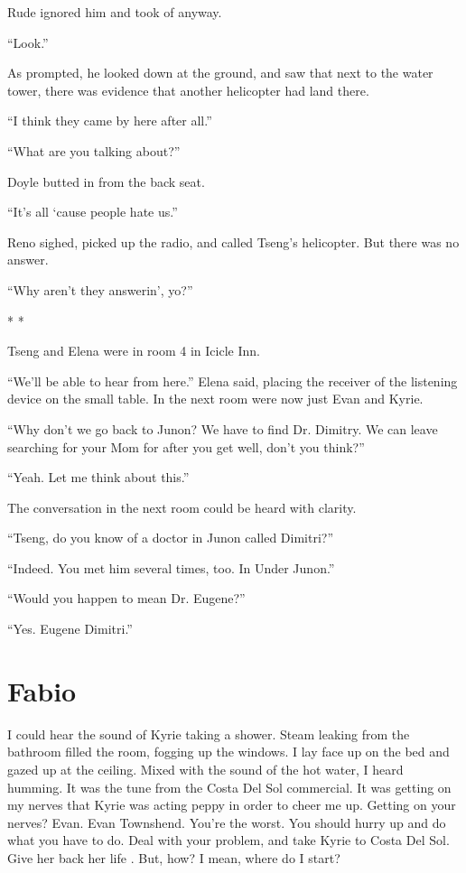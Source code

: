 \documentclass[oneside]{book}
\begin{document}
Rude ignored him and took of anyway.

“Look.”

As prompted, he looked down at the ground, and saw that next to the water tower, there was evidence that another helicopter had land there.

“I think they came by here after all.”

“What are you talking about?”

Doyle butted in from the back seat.

“It’s all ‘cause people hate us.”

Reno sighed, picked up the radio, and called Tseng’s helicopter. But there was no answer.

“Why aren’t they answerin’, yo?”

* *

Tseng and Elena were in room 4 in Icicle Inn.

“We’ll be able to hear from here.” Elena said, placing the receiver of the listening device on the small table. In the next room were now just Evan and Kyrie.

“Why don’t we go back to Junon? We have to find Dr. Dimitry. We can leave searching for your Mom for after you get well, don’t you think?”

“Yeah. Let me think about this.”

The conversation in the next room could be heard with clarity.

“Tseng, do you know of a doctor in Junon called Dimitri?”

“Indeed. You met him several times, too. In Under Junon.”

“Would you happen to mean Dr. Eugene?”

“Yes. Eugene Dimitri.”

\chapter{Fabio}
I could hear the sound of Kyrie taking a shower. Steam leaking from the bathroom filled the room, fogging up the windows. I lay face up on the bed and gazed up at the ceiling. Mixed with the sound of the hot water, I heard humming. It was the tune from the Costa Del Sol commercial. It was getting on my nerves that Kyrie was acting peppy in order to cheer me up. Getting on your nerves? Evan. Evan Townshend. You’re the worst. You should hurry up and do what you have to do. Deal with your problem, and take Kyrie to Costa Del Sol. Give her back her life . But, how? I mean, where do I start?
\end{document}

